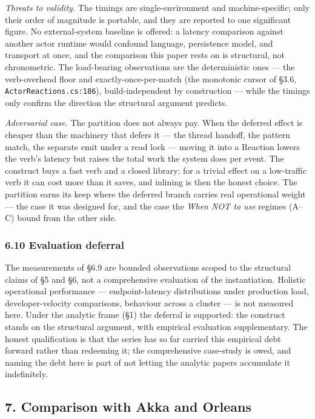 \documentclass[
]{article}
\let\origtexttt\texttt%
\renewcommand{\texttt}[1]{\origtexttt{\seqsplit{#1}}}%
\let\texttt\origtexttt%
\begin{document}
\emph{Threats to validity.} The timings are single-environment and
machine-specific; only their order of magnitude is portable, and they
are reported to one significant figure. No external-system baseline is
offered: a latency comparison against another actor runtime would
confound language, persistence model, and transport at once, and the
comparison this paper rests on is structural, not chronometric. The
load-bearing observations are the deterministic ones --- the
verb-overhead floor and exactly-once-per-match (the monotonic cursor of
§3.6, \texttt{ActorReactions.cs:186}), build-independent by construction
--- while the timings only confirm the direction the structural argument
predicts.

\emph{Adversarial case.} The partition does not always pay. When the
deferred effect is cheaper than the machinery that defers it --- the
thread handoff, the pattern match, the separate emit under a read lock
--- moving it into a Reaction lowers the verb's latency but raises the
total work the system does per event. The construct buys a fast verb and
a closed library; for a trivial effect on a low-traffic verb it can cost
more than it saves, and inlining is then the honest choice. The
partition earns its keep where the deferred branch carries real
operational weight --- the case it was designed for, and the case the
\emph{When NOT to use} regimes (A--C) bound from the other side.

\subsubsection{6.10 Evaluation deferral}\label{evaluation-deferral}

The measurements of §6.9 are bounded observations scoped to the
structural claims of §5 and §6, not a comprehensive evaluation of the
instantiation. Holistic operational performance --- endpoint-latency
distributions under production load, developer-velocity comparisons,
behaviour across a cluster --- is not measured here. Under the analytic
frame (§1) the deferral is supported: the construct stands on the
structural argument, with empirical evaluation supplementary. The honest
qualification is that the series has so far carried this empirical debt
forward rather than redeeming it; the comprehensive case-study is owed,
and naming the debt here is part of not letting the analytic papers
accumulate it indefinitely.

\subsection{7. Comparison with Akka and
Orleans}\label{comparison-with-akka-and-orleans}
\end{document}

